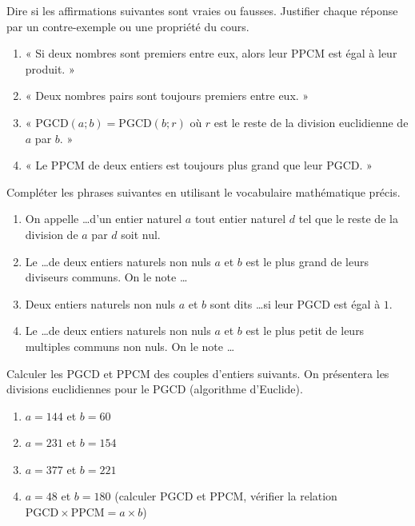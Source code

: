 \documentclass[11pt]{article}
\begin{document}
\begin{exercice}
Dire si les affirmations suivantes sont vraies ou fausses. Justifier chaque réponse par un contre-exemple ou une propriété du cours.
\begin{enumerate}
    \item « Si deux nombres sont premiers entre eux, alors leur PPCM est égal à leur produit. »
    \item « Deux nombres pairs sont toujours premiers entre eux. »
    \item « $\text{PGCD}(a ; b) = \text{PGCD}(b ; r)$ où $r$ est le reste de la division euclidienne de $a$ par $b$. »
    \item « Le PPCM de deux entiers est toujours plus grand que leur PGCD. »
\end{enumerate}
\end{exercice}

\begin{exercice}
Compléter les phrases suivantes en utilisant le vocabulaire mathématique précis.
\begin{enumerate}
    \item On appelle \ldots d'un entier naturel $a$ tout entier naturel $d$ tel que le reste de la division de $a$ par $d$ soit nul.
    \item Le \ldots de deux entiers naturels non nuls $a$ et $b$ est le plus grand de leurs diviseurs communs. On le note \ldots
    \item Deux entiers naturels non nuls $a$ et $b$ sont dits \ldots si leur PGCD est égal à $1$.
    \item Le \ldots de deux entiers naturels non nuls $a$ et $b$ est le plus petit de leurs multiples communs non nuls. On le note \ldots
\end{enumerate}
\end{exercice}

\begin{exercice}
Calculer les PGCD et PPCM des couples d'entiers suivants. On présentera les divisions euclidiennes pour le PGCD (algorithme d'Euclide).
\begin{enumerate}
    \item $a = 144$ et $b = 60$
    \item $a = 231$ et $b = 154$
    \item $a = 377$ et $b = 221$
    \item $a = 48$ et $b = 180$ (calculer PGCD et PPCM, vérifier la relation $\text{PGCD} \times \text{PPCM} = a \times b$)
\end{enumerate}
\end{exercice}
\end{document}
